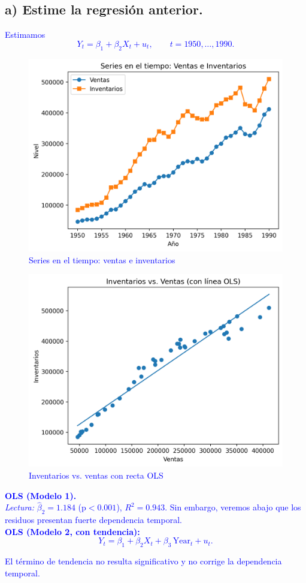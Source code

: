 \documentclass[10pt]{article}
\begin{document}
\subsection{a) Estime la regresión anterior.}
\textcolor{blue}{Estimamos
\begin{equation*}
Y_t = \beta_1 + \beta_2 X_t + u_t,\qquad t=1950,\dots,1990.
\end{equation*}


\begin{figure}[H]
    \centering
    \includegraphics[width=0.75\linewidth]{../plots/python/ex8/ex8_series_ventas_inventarios.png}
    \caption{Series en el tiempo: ventas e inventarios}
\end{figure}
\begin{figure}[H]
    \centering
    \includegraphics[width=0.6\linewidth]{../plots/python/ex8/ex8_scatter_inv_vs_sales.png}
    \caption{Inventarios vs. ventas con recta OLS}
\end{figure}
\textbf{OLS (Modelo 1).}\\

\textit{Lectura:} $\hat\beta_2=1.184$ (p$<0.001$), $R^2=0.943$. Sin embargo, veremos abajo que los residuos presentan fuerte dependencia temporal.\\
\textbf{OLS (Modelo 2, con tendencia):}
\begin{equation*}
Y_t = \beta_1 + \beta_2 X_t + \beta_3\,\text{Year}_t + u_t.
\end{equation*}

El término de tendencia no resulta significativo y no corrige la dependencia temporal.
}
\end{document}
